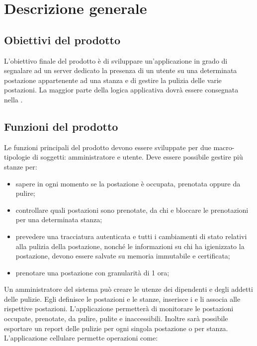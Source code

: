 \section{Descrizione generale}

\subsection{Obiettivi del prodotto}
L'obiettivo finale del prodotto è di sviluppare un’applicazione in grado di segnalare ad un server dedicato la presenza di un utente su una determinata postazione appartenente ad una stanza e di gestire la pulizia delle varie postazioni.
La maggior parte della logica applicativa dovrà essere consegnata nella  .

\subsection{Funzioni del prodotto}
Le funzioni principali del prodotto devono essere sviluppate per due macro-tipologie di soggetti: amministratore e utente.
Deve essere possibile gestire più stanze per:
\begin{itemize}
	\item sapere in ogni momento se la postazione è occupata, prenotata oppure da pulire; \\
	\item controllare quali postazioni sono prenotate, da chi e bloccare le prenotazioni per una determinata stanza; \\
	\item prevedere una tracciatura autenticata e tutti i cambiamenti di stato relativi alla pulizia della postazione, nonché le informazioni su chi ha igienizzato la postazione, devono essere salvate su memoria immutabile e certificata; \\
	\item prenotare una postazione con granularità di 1 ora; \\
\end{itemize}
Un amministratore del sistema può creare le utenze dei dipendenti e degli addetti delle pulizie. Egli definisce le postazioni e le stanze, inserisce i  e li associa alle rispettive postazioni.
L'applicazione permetterà di monitorare le postazioni occupate, prenotate, da pulire, pulite e inaccessibili. Inoltre sarà possibile esportare un report delle pulizie per ogni singola postazione o per stanza.
L’applicazione cellulare permette operazioni come:
